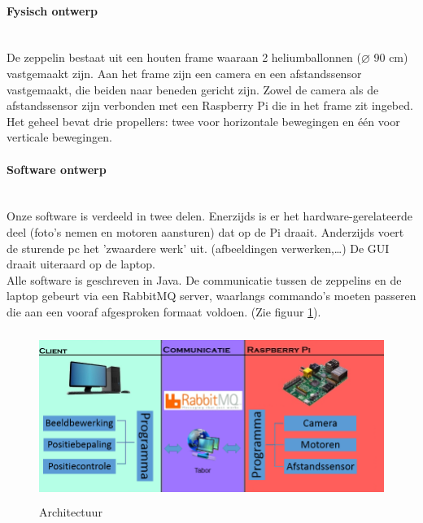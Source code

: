 \documentclass[eind]{penoverslag}
\begin{document}
\paragraph{Fysisch ontwerp}
~\\
De zeppelin bestaat uit een houten frame waaraan 2 heliumballonnen ($\diameter$ 90 cm) vastgemaakt zijn. Aan het frame zijn een camera en een afstandssensor vastgemaakt, die beiden naar beneden gericht zijn. Zowel de camera als de afstandssensor zijn verbonden met een Raspberry Pi die in het frame zit ingebed. Het geheel bevat drie propellers: twee voor horizontale bewegingen en \'{e}\'{e}n voor verticale bewegingen.


\paragraph{Software ontwerp}
~\\
Onze software is verdeeld in twee delen. Enerzijds is er het hardware-gerelateerde deel (foto's nemen en motoren aansturen) dat op de Pi draait. Anderzijds voert de sturende pc het 'zwaardere werk' uit. (afbeeldingen verwerken,\ldots) De GUI draait uiteraard op de laptop. \\
Alle software is geschreven in Java. De communicatie tussen de zeppelins en de laptop gebeurt via een RabbitMQ server, waarlangs commando's moeten passeren die aan een vooraf afgesproken formaat voldoen. (Zie figuur \ref{schema}). \\

\begin{figure}[ht!]
\centering
\includegraphics[height=55mm]{Schema.png}
\caption{Architectuur}
\label{schema}
\end{figure}

\end{document}
